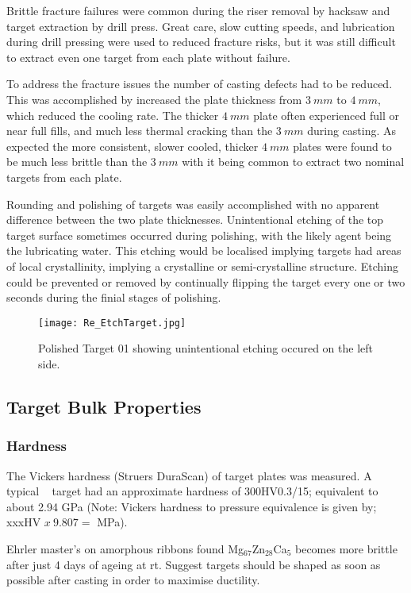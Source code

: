 \documentclass[a4paper,12pt,oneside]{report}%
\begin{document}
Brittle fracture failures were common during the riser removal by hacksaw and target extraction by drill press. Great care, slow cutting speeds, and lubrication during drill pressing were used to reduced fracture risks, but it was still difficult to extract even one target from each plate without failure.

To address the fracture issues the number of casting defects had to be reduced. This was accomplished by increased the plate thickness from $3~ mm$ to $4~ mm$, which reduced the cooling rate. The thicker $4~ mm$ plate often experienced full or near full fills, and much less thermal cracking than the $3~ mm$ during casting. As expected the more consistent, slower cooled, thicker $4~ mm$ plates were found to be much less brittle than the $3~ mm$ with it being common to extract two nominal targets from each plate.

Rounding and polishing of targets was easily accomplished with no apparent difference between the two plate thicknesses. Unintentional etching of the top target surface sometimes occurred during polishing, with the likely agent being the lubricating water. This etching would be localised implying targets had areas of local crystallinity, implying a crystalline or semi-crystalline structure. Etching could be prevented or removed by continually flipping the target every one or two seconds during the finial stages of polishing. 

\begin{figure}[htbp]
	\centering
	\texttt{[image: Re\_EtchTarget.jpg]}
	\caption{Polished Target 01 showing unintentional etching occured on the left side.}
	\label{fig:EtchedTarget}
\end{figure}

\subsection{Target Bulk Properties}
\subsubsection{Hardness}
The Vickers hardness (Struers DuraScan) of target plates was measured. A typical \MgZnCa~ target had an approximate hardness of 300HV0.3/15; equivalent to about 2.94 GPa (Note: Vickers hardness to pressure equivalence is given by; xxxHV $x~ 9.807 =$ MPa).

Ehrler \cite{Ehrler2008} master's on amorphous ribbons found Mg$_{67}$Zn$_{28}$Ca$_{5}$ becomes more brittle after just 4 days of ageing at \gls{rt}. Suggest targets should be shaped as soon as possible after casting in order to maximise ductility. 
\end{document}

